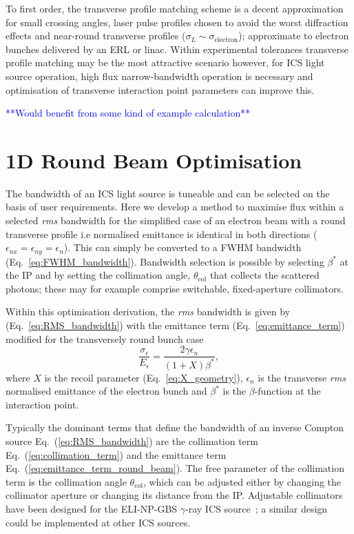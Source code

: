\documentclass[../main.tex]{subfiles}
\begin{document}
To first order, the transverse profile matching scheme is a decent approximation for small crossing angles, laser pulse profiles chosen to avoid the worst diffraction effects and near-round transverse profiles ($\sigma_{L}\sim\sigma_{\mathrm{electron}}$); approximate to electron bunches delivered by an ERL or linac. Within experimental tolerances transverse profile matching may be the most attractive scenario however, for ICS light source operation, high flux narrow-bandwidth operation is necessary and optimisation of transverse interaction point parameters can improve this. 

\textcolor{blue}{**Would benefit from some kind of example calculation**}

\section{1D Round Beam Optimisation}
\label{sec:RB_optimisation}

The bandwidth of an ICS light source is tuneable and can be selected on the basis of user requirements. Here we develop a method to maximise flux within a selected \textit{rms} bandwidth for the simplified case of an electron beam with a round transverse profile i.e normalised emittance is identical in both directions ($\epsilon_{nx} = \epsilon_{ny} = \epsilon_{n}$). This can simply be converted to a FWHM bandwidth (Eq.~\ref{eq:FWHM_bandwidth}). Bandwidth selection is possible by selecting $\beta^{*}$ at the IP and by setting the collimation angle, $\theta_{\mathrm{col}}$ that collects the scattered photons; these may for example comprise switchable, fixed-aperture collimators.

Within this optimisation derivation, the \textit{rms} bandwidth is given by (Eq.~\ref{eq:RMS_bandwidth}) with the emittance term (Eq.~\ref{eq:emittance_term}) modified for the transversely round bunch case
\begin{equation}
\frac{\sigma_{\epsilon}}{E_{\epsilon}} = \frac{2\gamma\epsilon_{n}}{\left(1+X\right)\beta^{*}},
\label{eq:emittance_term_round_beam}    
\end{equation}
where $X$ is the recoil parameter (Eq.~\ref{eq:X_geometry}), $\epsilon_{n}$ is the transverse \textit{rms} normalised emittance of the electron bunch and $\beta^{*}$ is the $\beta$-function at the interaction point.

Typically the dominant terms that define the bandwidth of an inverse Compton source Eq.~(\ref{eq:RMS_bandwidth}) are the collimation term Eq.~(\ref{eq:collimation_term}) and the emittance term Eq.~(\ref{eq:emittance_term_round_beam}). The free parameter of the collimation term is the collimation angle $\theta_{\mathrm{col}}$, which can be adjusted either by changing the collimator aperture or changing its distance from the IP. Adjustable collimators have been designed for the ELI-NP-GBS $\gamma$-ray ICS source~\cite{paterno2017collimation}; a similar design could be implemented at other ICS sources.
\end{document}
